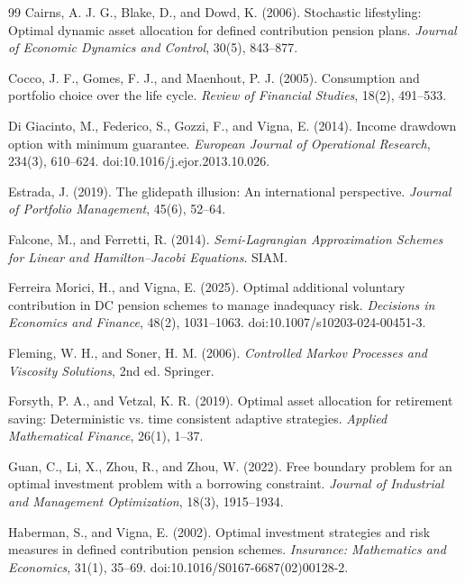 \documentclass[10pt,a4paper]{article}
\theoremstyle{plain}
\theoremstyle{definition}
\begin{document}
\begin{thebibliography}{99}
Cairns, A. J. G., Blake, D., and Dowd, K. (2006).
Stochastic lifestyling: Optimal dynamic asset allocation for defined contribution pension plans.
\emph{Journal of Economic Dynamics and Control}, 30(5), 843--877.

Cocco, J. F., Gomes, F. J., and Maenhout, P. J. (2005).
Consumption and portfolio choice over the life cycle.
\emph{Review of Financial Studies}, 18(2), 491--533.

Di Giacinto, M., Federico, S., Gozzi, F., and Vigna, E. (2014).
Income drawdown option with minimum guarantee.
\emph{European Journal of Operational Research}, 234(3), 610--624.
doi:10.1016/j.ejor.2013.10.026.

Estrada, J. (2019).
The glidepath illusion: An international perspective.
\emph{Journal of Portfolio Management}, 45(6), 52--64.

Falcone, M., and Ferretti, R. (2014).
\emph{Semi-Lagrangian Approximation Schemes for Linear and Hamilton--Jacobi Equations}.
SIAM.

Ferreira Morici, H., and Vigna, E. (2025).
Optimal additional voluntary contribution in DC pension schemes to manage inadequacy risk.
\emph{Decisions in Economics and Finance}, 48(2), 1031--1063.
doi:10.1007/s10203-024-00451-3.

Fleming, W. H., and Soner, H. M. (2006).
\emph{Controlled Markov Processes and Viscosity Solutions}, 2nd ed.
Springer.

Forsyth, P. A., and Vetzal, K. R. (2019).
Optimal asset allocation for retirement saving: Deterministic vs. time consistent adaptive strategies.
\emph{Applied Mathematical Finance}, 26(1), 1--37.

Guan, C., Li, X., Zhou, R., and Zhou, W. (2022).
Free boundary problem for an optimal investment problem with a borrowing constraint.
\emph{Journal of Industrial and Management Optimization}, 18(3), 1915--1934.

Haberman, S., and Vigna, E. (2002).
Optimal investment strategies and risk measures in defined contribution pension schemes.
\emph{Insurance: Mathematics and Economics}, 31(1), 35--69.
doi:10.1016/S0167-6687(02)00128-2.


\end{thebibliography}
\end{document}
